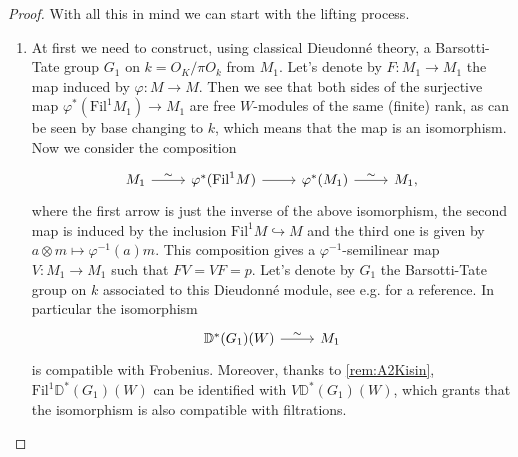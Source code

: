 \begin{proof}
With all this in mind we can start with the lifting process.
\begin{enumerate}
\item	At first we need to construct, using classical Dieudonné theory,
	a Barsotti-Tate group $G_1$ on $k = O_K/\pi O_k$ from $M_1$.
	Let's denote by $F\colon M_1 \to M_1$ the map induced by
	$\varphi\colon M \to M$.
	Then we see that both sides of the surjective map
	$\varphi^* ( \mathrm{Fil}^1 M_1) \to M_1$ are free $W$-modules of the same (finite) rank,
	as can be seen by base changing to $k$, which means that the map is an isomorphism.
	Now we consider the composition
	\begin{equation*}
	\begin{tikzcd}
		M_1 \arrow[r, "\sim", rightarrow] &
		\varphi^* (\mathrm{Fil}^1 M) \arrow[r, "", rightarrow] &
		\varphi^* (M_1) \arrow[r, "\sim", rightarrow] &
		M_1
	,\end{tikzcd}
	\end{equation*}
	where the first arrow is just the inverse of the above isomorphism, the second map
	is induced by the inclusion $\mathrm{Fil}^1 M \hookrightarrow M$ and the
	third one is given by $a \otimes m \mapsto \varphi^{-1}(a)m$.
	This composition gives a $\varphi^{-1}$-semilinear map $V\colon M_1 \to M_1$
	such that $FV = VF = p$.
	Let's denote by $G_1$ the Barsotti-Tate group on $k$ associated to this
	Dieudonné module, see e.g. \cite[Proposition 7.2.6]{Brinon} for a reference.
	In particular the isomorphism
	\begin{equation*}
	\begin{tikzcd}[row sep = 0ex
		,/tikz/column 1/.append style={anchor=base east}
		,/tikz/column 2/.append style={anchor=base west}]
		\mathbb{D}^*(G_1)(W) \arrow[r, "\sim", rightarrow] &
		M_1
	\end{tikzcd}
	\end{equation*} 
	is compatible with Frobenius.
	Moreover, thanks to \cref{rem:A2Kisin}, $\mathrm{Fil}^1 \mathbb{D}^*(G_1)(W)$
	can be identified with $V \mathbb{D}^*(G_1)(W)$, which grants that the isomorphism
	is also compatible with filtrations.


\end{enumerate}
\end{proof}
